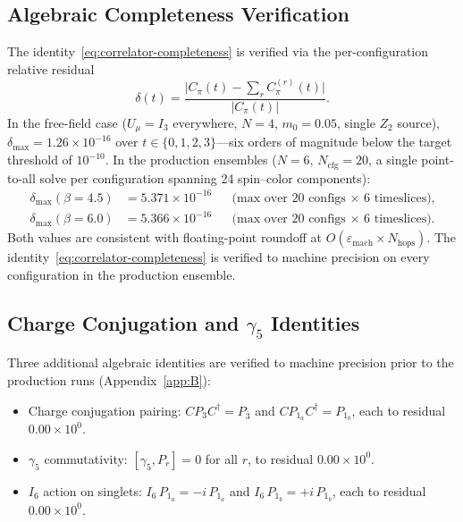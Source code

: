 \documentclass[12pt]{article}
\theoremstyle{definition}
\theoremstyle{remark}
\newcommand{\Isix}{I_6}                              %
\newcommand{\Ncfg}{N_{\mathrm{cfg}}}                  %
\begin{document}
	\subsection{Algebraic Completeness Verification}
	\label{sec:completeness-verification}
	
	The identity~\eqref{eq:correlator-completeness} is verified via the
	per-configuration relative residual
	\begin{equation}
		\delta(t) = \frac{\bigl|C_\pi(t) - \sum_r C_\pi^{(r)}(t)\bigr|}
		{\bigl|C_\pi(t)\bigr|}.
		\label{eq:completeness-residual}
	\end{equation}
	In the free-field case ($U_\mu=I_3$ everywhere, $N=4$, $m_0=0.05$, single
	$Z_2$ source), $\delta_{\max} = 1.26\times10^{-16}$ over
	$t\in\{0,1,2,3\}$---six orders of magnitude below the target threshold
	of $10^{-10}$.  In the production ensembles ($N=6$, $\Ncfg=20$, a single
	point-to-all solve per configuration spanning 24 spin--color components):
	\begin{align*}
		\delta_{\max}(\beta=4.5)
		&= 5.371\times10^{-16}
		&&\text{(max over 20 configs $\times$ 6 timeslices),}\\
		\delta_{\max}(\beta=6.0)
		&= 5.366\times10^{-16}
		&&\text{(max over 20 configs $\times$ 6 timeslices).}
	\end{align*}
	Both values are consistent with floating-point roundoff at
	$O(\varepsilon_{\mathrm{mach}}\times N_{\mathrm{hops}})$.  The
	identity~\eqref{eq:correlator-completeness} is verified to machine precision
	on every configuration in the production ensemble.
	
	\subsection{Charge Conjugation and \texorpdfstring{$\gamma_5$}{gamma5}
		Identities}
	\label{sec:additional-idents}
	
	Three additional algebraic identities are verified to machine precision prior
	to the production runs (Appendix~\ref{app:B}):
	
	\begin{itemize}
		\item Charge conjugation pairing: $CP_3 C^\dagger = P_{\bar{3}}$ and
		$CP_{1_a} C^\dagger = P_{1_b}$, each to residual $0.00\times10^0$.
		\item $\gamma_5$ commutativity: $[\gamma_5, P_r] = 0$ for all $r$, to residual
		$0.00\times10^0$.
		\item $\Isix$ action on singlets: $\Isix\,P_{1_a} = -i\,P_{1_a}$ and
		$\Isix\,P_{1_b} = +i\,P_{1_b}$, each to residual $0.00\times10^0$.
	\end{itemize}
	
\end{document}
